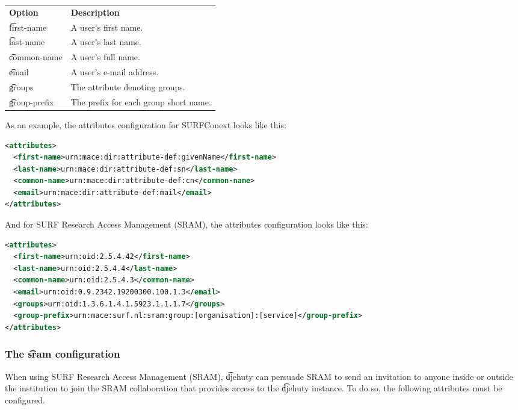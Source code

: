 \begin{tabularx}{\textwidth}{*{1}{!{\VRule[-1pt]}l}!{\VRule[-1pt]}X}
  \headrow
  \textbf{Option}             & \textbf{Description}\\
  \t{first-name}              & A user's first name.\\
  \t{last-name}               & A user's last name.\\
  \t{common-name}             & A user's full name.\\
  \t{email}                   & A user's e-mail address.\\
  \t{groups}                  & The attribute denoting groups.\\
  \t{group-prefix}            & The prefix for each group short name.
\end{tabularx}

  As an example, the attributes configuration for SURFConext looks like this:

\begin{lstlisting}[language=xml]
<attributes>
  <first-name>urn:mace:dir:attribute-def:givenName</first-name>
  <last-name>urn:mace:dir:attribute-def:sn</last-name>
  <common-name>urn:mace:dir:attribute-def:cn</common-name>
  <email>urn:mace:dir:attribute-def:mail</email>
</attributes>
\end{lstlisting}

  And for SURF Research Access Management (SRAM), the attributes configuration
  looks like this:

\begin{lstlisting}[language=xml]
<attributes>
  <first-name>urn:oid:2.5.4.42</first-name>
  <last-name>urn:oid:2.5.4.4</last-name>
  <common-name>urn:oid:2.5.4.3</common-name>
  <email>urn:oid:0.9.2342.19200300.100.1.3</email>
  <groups>urn:oid:1.3.6.1.4.1.5923.1.1.1.7</groups>
  <group-prefix>urn:mace:surf.nl:sram:group:[organisation]:[service]</group-prefix>
</attributes>
\end{lstlisting}

\subsubsection{The \t{sram} configuration}

  When using SURF Research Access Management (SRAM),
  \t{djehuty} can persuade SRAM to send an invitation to anyone
  inside or outside the institution to join the SRAM collaboration
  that provides access to the \t{djehuty} instance.  To do so,
  the following attributes must be configured.

